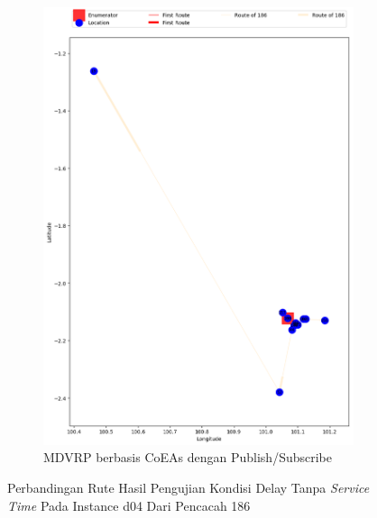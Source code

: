 \begin{figure}[H]\ContinuedFloat
	\centering
	\begin{subfigure}[t]{\textwidth}
		\centering
		\includegraphics[width=\textwidth]{Resources/Images/delayed_4/real_m15_n100_delayed_4_186_pubsub_coes}
		\caption{MDVRP berbasis CoEAs dengan Publish/Subscribe}
		\label{fig:real_m15_n100_delayed_4_186_pubsub_coes}
	\end{subfigure}
	\caption{Perbandingan Rute Hasil Pengujian Kondisi Delay Tanpa \textit{Service Time} Pada Instance d04 Dari Pencacah 186}
	\label{fig:real_m15_n100_delayed_4_186_contd}
\end{figure}



